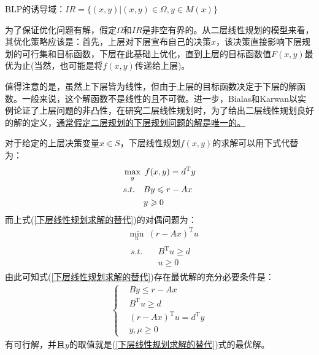     \begin{definition}
    BLP的诱导域：$IR=\{(x,y)|(x,y)\in \Omega,y \in M(x)\}$
    \end{definition}
    \par
    为了保证优化问题有解，假定$\Omega$和$IR$是非空有界的。从二层线性规划的模型来看，其优化策略应该是：首先，上层对下层宣布自己的决策$x$，该决策直接影响下层规划的可行集和目标函数，下层在此基础上优化，直到上层的目标函数值$F(x,y)$最优为止(当然，也可能是将$f(x,y)$传递给上层)。
    \par
    值得注意的是，虽然上下层皆为线性，但由于上层的目标函数决定于下层的解函数。一般来说，这个解函数不是线性的且不可微。进一步，Bialas和Karwan以实例论证了上层问题的非凸性，在研究二层线性规划时，为了给出二层线性规划良好的解的定义，\uline{通常假定二层规划的下层规划问题的解是唯一的。}
    \par
    对于给定的上层决策变量$x\in S$，下层线性规划$f(x,y)$的求解可以用下式代替为：
    \begin{align}
    \label{下层线性规划求解的替代}
        & \mathop{\max}\limits_{y}\  f(x,y)=d^\mathrm{T} y\notag\\
        & \begin{aligned}
        s.t.\quad & By\leqslant r-Ax\\
        &y \geqslant 0
        \end{aligned}
    \end{align}
    而上式(\ref{下层线性规划求解的替代})的对偶问题为：
    \begin{align*}
        & \mathop{\min}\limits_{u}\  (r-Ax)^\mathrm{T} u\\
        & \begin{aligned}
        s.t.\quad & B^\mathrm{T} u\geqslant d\\
        &u \geqslant 0
        \end{aligned}
    \end{align*}
    由此可知式(\ref{下层线性规划求解的替代})存在最优解的充分必要条件是：
    \begin{align*}
    \left\{\begin{aligned}
        & By\leqslant r-Ax\\
        & B^\mathrm{T} u\geqslant d\\
        & (r-Ax)^\mathrm{T} u=d^\mathrm{T} y\\
        & y,\mu \geqslant 0
        \end{aligned}
            \right.
    \end{align*}
    有可行解，并且$y$的取值就是(\ref{下层线性规划求解的替代})式的最优解。
